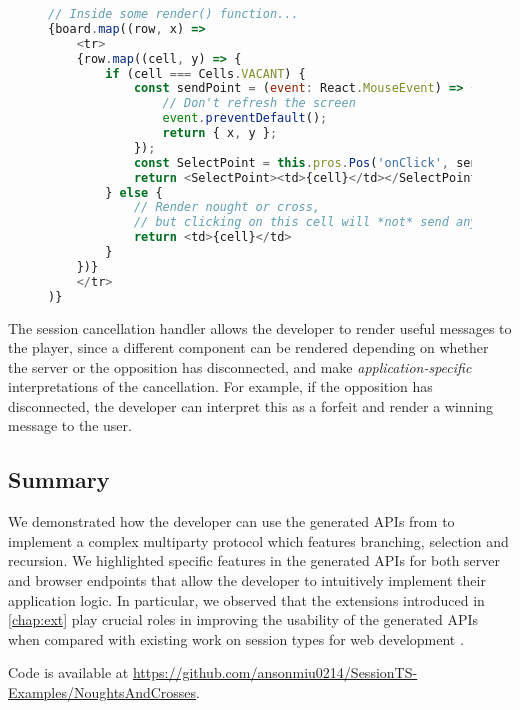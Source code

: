 \begin{figure}[!h]
\begin{lstlisting}[language=javascript,tabsize=2]
// Inside some render() function...
{board.map((row, x) =>
	<tr>
	{row.map((cell, y) => {
		if (cell === Cells.VACANT) {
			const sendPoint = (event: React.MouseEvent) => {
				// Don't refresh the screen
				event.preventDefault();
				return { x, y };
			});
			const SelectPoint = this.pros.Pos('onClick', sendPoint);
			return <SelectPoint><td>{cell}</td></SelectPoint>
		} else {
			// Render nought or cross,
			// but clicking on this cell will *not* send anything
			return <td>{cell}</td>
		}		
	})}
	</tr>
)}
\end{lstlisting}
\label{lst:gamesendfactory}
\end{figure}

The session cancellation handler allows the developer
to render useful messages to the player, since
a different component can be rendered depending on whether
the server or the opposition has disconnected,
and make \textit{application-specific} interpretations of the cancellation.
For example, if the opposition has disconnected,
the developer can interpret this as a forfeit and
render a winning message to the user.

\subsection{Summary}
We demonstrated how the developer can use the generated APIs
from \codegen to implement a complex multiparty protocol
which features branching, selection and recursion.
We highlighted specific features in the generated APIs for both
server and browser endpoints that allow the developer
to intuitively implement their application logic.
In particular, we observed that the extensions introduced
in \cref{chap:ext} play crucial roles in
improving the usability of the generated APIs when
compared with existing work on session types for web development 
\cite{PureScript2019,MVU2020,LINKS}.

Code is available at 
\url{https://github.com/ansonmiu0214/SessionTS-Examples/NoughtsAndCrosses}.